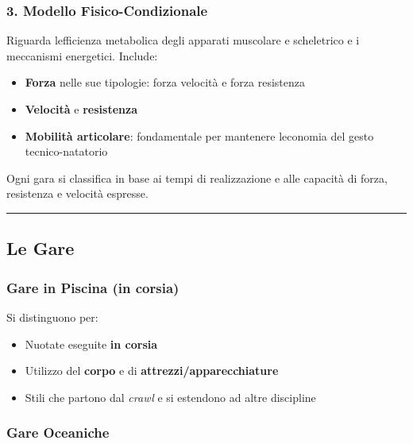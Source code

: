 \documentclass[a4paper,11pt]{article}
\providecommand{\tightlist}{%
  \setlength{\itemsep}{0pt}\setlength{\parskip}{0pt}}
\begin{document}
\subsubsection{3. Modello
      Fisico-Condizionale}\label{modello-fisico-condizionale}

Riguarda l\textquotesingle efficienza metabolica degli apparati
muscolare e scheletrico e i meccanismi energetici. Include:

\begin{itemize}
      \tightlist
      \item
            \textbf{Forza} nelle sue tipologie: forza velocità e forza resistenza
      \item
            \textbf{Velocità} e \textbf{resistenza}
      \item
            \textbf{Mobilità articolare}: fondamentale per mantenere
            l\textquotesingle economia del gesto tecnico-natatorio
\end{itemize}

Ogni gara si classifica in base ai tempi di realizzazione e alle
capacità di forza, resistenza e velocità espresse.

\begin{center}\rule{0.5\linewidth}{0.5pt}\end{center}

\subsection{Le Gare}\label{le-gare}

\subsubsection{Gare in Piscina (in
      corsia)}\label{gare-in-piscina-in-corsia}

Si distinguono per:

\begin{itemize}
      \tightlist
      \item
            Nuotate eseguite \textbf{in corsia}
      \item
            Utilizzo del \textbf{corpo} e di \textbf{attrezzi/apparecchiature}
      \item
            Stili che partono dal \emph{crawl} e si estendono ad altre discipline
\end{itemize}

\subsubsection{Gare Oceaniche}\label{gare-oceaniche}
\end{document}
